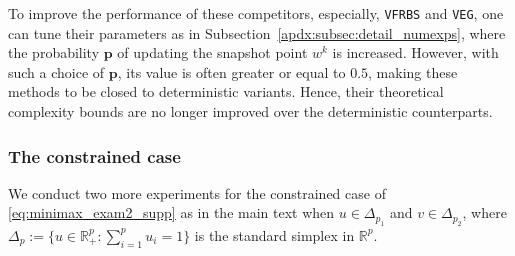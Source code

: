 \documentclass{article}
\newcommand{\R}{\mathbb{R}}
\newcommand{\sets}[1]{\{#1\}}
\newcommand{\beforesubsubsec}{\vspace{-1.5ex}}
\newcommand{\aftersubsubsec}{\vspace{-1.5ex}}
\theoremstyle{plain}
\theoremstyle{definition}
\theoremstyle{remark}
\begin{document}
To improve the performance of these competitors, especially, \texttt{VFRBS} and \texttt{VEG}, one can tune their parameters as in Subsection~\ref{apdx:subsec:detail_numexps}, where the probability $\mathbf{p}$ of updating the snapshot point $w^k$ is increased.
However, with such a choice of $\mathbf{p}$, its value is often greater or equal to $0.5$, making these methods to be closed to deterministic variants.
Hence, their theoretical complexity bounds are no longer improved over the deterministic counterparts.

%
%

\beforesubsubsec
\subsubsection{The constrained case}\label{subsec:exam2_constrained}
\aftersubsubsec
We conduct two more experiments for the constrained case of \eqref{eq:minimax_exam2_supp} as in the main text when $u \in \Delta_{p_1}$ and $v \in \Delta_{p_2}$, where $\Delta_p := \sets{u \in \R^p_{+}: \sum_{i=1}^pu_i = 1}$ is the standard simplex in $\R^p$. 
\end{document}

